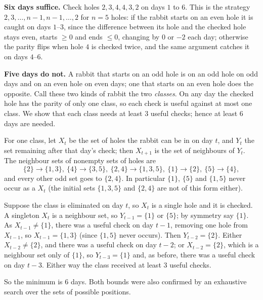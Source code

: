 \textbf{Six days suffice.} Check holes $2,3,4,4,3,2$ on days $1$ to $6$. This is the strategy $2,3,\dots,n-1,n-1,\dots,2$ for $n=5$ holes: if the rabbit starts on an even hole it is caught on days $1$--$3$, since the difference between its hole and the checked hole stays even, starts $\ge0$ and ends $\le0$, changing by $0$ or $-2$ each day; otherwise the parity flips when hole $4$ is checked twice, and the same argument catches it on days $4$--$6$.

\textbf{Five days do not.} A rabbit that starts on an odd hole is on an odd hole on odd days and on an even hole on even days; one that starts on an even hole does the opposite. Call these two kinds of rabbit the two \emph{classes}. On any day the checked hole has the parity of only one class, so each check is useful against at most one class. We show that each class needs at least $3$ useful checks; hence at least $6$ days are needed.

For one class, let $X_t$ be the set of holes the rabbit can be in on day $t$, and $Y_t$ the set remaining after that day's check; then $X_{t+1}$ is the set of neighbours of $Y_t$. The neighbour sets of nonempty sets of holes are
\[
\{2\}\!\to\!\{1,3\},\ \{4\}\!\to\!\{3,5\},\ \{2,4\}\!\to\!\{1,3,5\},\ \{1\}\!\to\!\{2\},\ \{5\}\!\to\!\{4\},
\]
and every other odd set goes to $\{2,4\}$. In particular $\{1\}$, $\{5\}$ and $\{1,5\}$ never occur as a $X_t$ (the initial sets $\{1,3,5\}$ and $\{2,4\}$ are not of this form either).

Suppose the class is eliminated on day $t$, so $X_t$ is a single hole and it is checked. A singleton $X_t$ is a neighbour set, so $Y_{t-1}=\{1\}$ or $\{5\}$; by symmetry say $\{1\}$. As $X_{t-1}\ne\{1\}$, there was a useful check on day $t-1$, removing one hole from $X_{t-1}$, so $X_{t-1}=\{1,3\}$ (since $\{1,5\}$ never occurs). Then $Y_{t-2}=\{2\}$. Either $X_{t-2}\ne\{2\}$, and there was a useful check on day $t-2$; or $X_{t-2}=\{2\}$, which is a neighbour set only of $\{1\}$, so $Y_{t-3}=\{1\}$ and, as before, there was a useful check on day $t-3$. Either way the class received at least $3$ useful checks.

So the minimum is $\boxed{6}$ days. Both bounds were also confirmed by an exhaustive search over the sets of possible positions.
